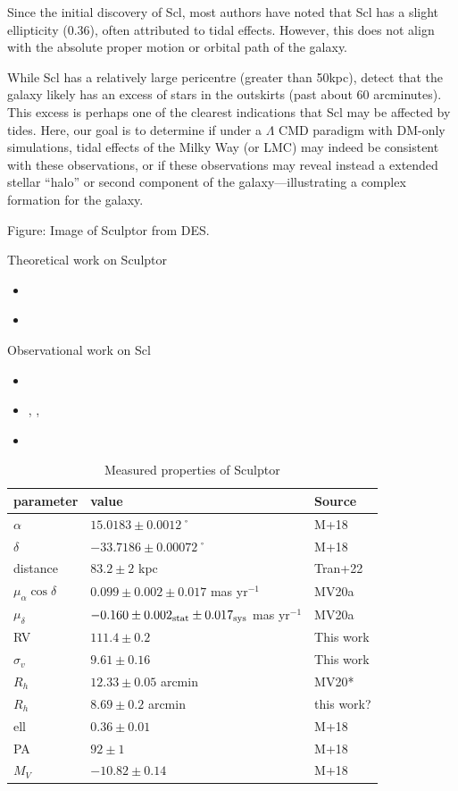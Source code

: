 Since the initial discovery of Scl, most authors have noted that Scl has
a slight ellipticity (\(0.36\)), often attributed to tidal effects.
However, this does not align with the absolute proper motion or orbital
path of the galaxy.

While Scl has a relatively large pericentre (greater than 50kpc),
\citet{Sestito+23} detect that the galaxy likely has an excess of stars
in the outskirts (past about 60 arcminutes). This excess is perhaps one
of the clearest indications that Scl may be affected by tides. Here, our
goal is to determine if under a \(\Lambda\) CMD paradigm with DM-only
simulations, tidal effects of the Milky Way (or LMC) may indeed be
consistent with these observations, or if these observations may reveal
instead a extended stellar ``halo'' or second component of the
galaxy---illustrating a complex formation for the galaxy.

Figure: Image of Sculptor from DES.

Theoretical work on Sculptor

\begin{itemize}
\tightlist
\item
  \citet{battaglia+2008}
\item
  \citet{iorio+2019}
\end{itemize}

Observational work on Scl

\begin{itemize}
\tightlist
\item
  \citet{sestito+2023a}
\item
  \citet{tolstoy+2023}, \citet{arroyo-polonio+2023},
  \citet{arroyo-polonio+2024}
\item
  \citet{eskridge1988}
\end{itemize}

\begin{table}[t]
\centering
\caption{Measured properties of Sculptor}
\label{tbl:Measured-properties-of-Sculptor}
\begin{tabular}{lll}
\toprule
parameter & value & Source\\
\midrule
$\alpha$ & $15.0183 \pm 0.0012$˚ & M+18\\
$\delta$ & $-33.7186 \pm 0.00072$˚ & M+18\\
distance & $83.2 \pm 2$ kpc & Tran+22\\
$\mu_\alpha \cos \delta$ & $0.099 \pm 0.002 \pm 0.017$ mas yr$^{-1}$ & MV20a\\
$\mu_\delta$ & $-0.160 \pm 0.002_{\rm stat} \pm 0.017_{\rm sys}$ mas yr$^{-1}$ & MV20a\\
RV & $111.4 \pm 0.2$ & This work\\
$\sigma_v$ & $9.61\pm0.16$ & This work\\
$R_h$ & $12.33 \pm 0.05$ arcmin & MV20*\\
$R_h$ & $8.69 \pm 0.2$ arcmin & this work?\\
ell & $0.36 \pm 0.01$ & M+18\\
PA & $92\pm1$ & M+18\\
$M_V$ & $-10.82\pm0.14$ & M+18\\
\bottomrule
\end{tabular}
\end{table}

